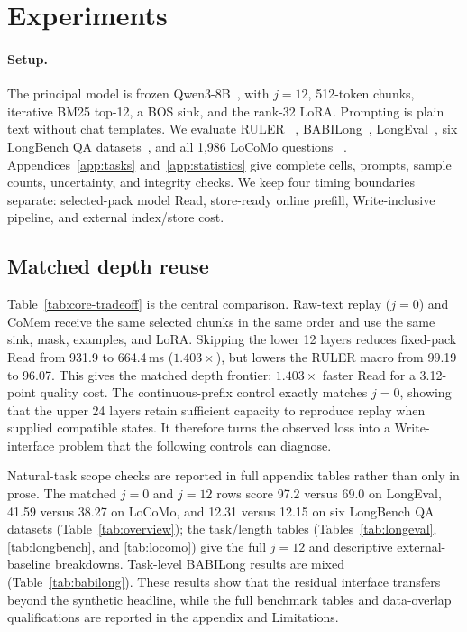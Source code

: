 \section{Experiments}
\label{sec:experiments}

\paragraph{Setup.}
The principal model is frozen Qwen3-8B~\citep{qwen3}, with $j{=}12$,
512-token chunks, iterative BM25 top-12, a BOS sink, and the rank-32 LoRA.
Prompting is plain text without chat templates. We evaluate RULER
~\citep{ruler}, BABILong~\citep{babilong}, LongEval~\citep{longchat}, six
LongBench QA datasets~\citep{longbench}, and all 1,986 LoCoMo questions
~\citep{locomo}. Appendices~\ref{app:tasks} and~\ref{app:statistics} give
complete cells, prompts, sample counts, uncertainty, and integrity checks. We keep four
timing boundaries separate: selected-pack model Read, store-ready online
prefill, Write-inclusive pipeline, and external index/store cost.

\subsection{Matched depth reuse}


Table~\ref{tab:core-tradeoff} is the central comparison. Raw-text replay
($j{=}0$) and CoMem receive the same selected chunks in the same order and use
the same sink, mask, examples, and LoRA. Skipping the lower 12 layers reduces
fixed-pack Read from 931.9 to 664.4\,ms ($1.403\times$), but lowers the RULER
macro from 99.19 to 96.07. This gives the matched depth frontier: $1.403\times$ faster Read for a
3.12-point quality cost. The continuous-prefix control exactly matches $j{=}0$,
showing that the upper 24 layers retain sufficient capacity to reproduce replay
when supplied compatible states. It therefore turns the observed loss into a
Write-interface problem that the following controls can diagnose.

Natural-task scope checks are reported in full appendix tables rather than only
in prose. The matched $j{=}0$ and $j{=}12$ rows score 97.2 versus 69.0 on
LongEval, 41.59 versus 38.27 on LoCoMo, and 12.31 versus 12.15 on six
LongBench QA datasets (Table~\ref{tab:overview}); the task/length tables
(Tables~\ref{tab:longeval}, \ref{tab:longbench}, and \ref{tab:locomo}) give the
full $j{=}12$ and descriptive external-baseline breakdowns. Task-level BABILong
results are mixed (Table~\ref{tab:babilong}). These results show that the residual interface transfers beyond the synthetic
headline, while the full benchmark tables and data-overlap qualifications are
reported in the appendix and Limitations.

